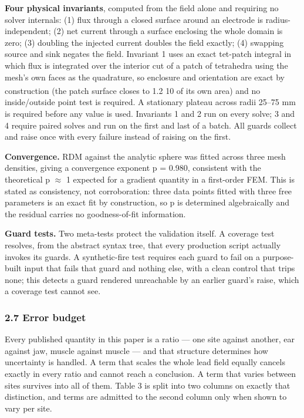 \documentclass[
  11pt,
  letterpaper,
]{article}
\newcounter{none} %
\begin{document}
\textbf{Four physical invariants}, computed from the field alone and requiring no
solver internals: (1) flux through a closed surface around an electrode is
radius-independent; (2) net current through a surface enclosing the whole domain
is zero; (3) doubling the injected current doubles the field exactly; (4)
swapping source and sink negates the field. Invariant 1 uses an exact tet-patch
integral in which flux is integrated over the interior cut of a patch of
tetrahedra using the mesh's own faces as the quadrature, so enclosure and
orientation are exact by construction (the patch surface closes to 1.2 \texttimes{} 10\textsuperscript{}
of its own area) and no inside/outside point test is required. A stationary
plateau across radii 25--75 mm is required before any value is used. Invariants 1
and 2 run on every solve; 3 and 4 require paired solves and run on the first and
last of a batch. All guards collect and raise once with every failure instead of
raising on the first.

\textbf{Convergence.} RDM against the analytic sphere was fitted across three mesh
densities, giving a convergence exponent p = 0.980, consistent with the
theoretical p $\approx$ 1 expected for a gradient quantity in a first-order FEM. This is
stated as consistency, not corroboration: three data points fitted with three
free parameters is an exact fit by construction, so p is determined
algebraically and the residual carries no goodness-of-fit information.

\textbf{Guard tests.} Two meta-tests protect the validation itself. A coverage test
resolves, from the abstract syntax tree, that every production script actually
invokes its guards. A synthetic-fire test requires each guard to fail on a
purpose-built input that fails that guard and nothing else, with a clean control
that trips none; this detects a guard rendered unreachable by an earlier guard's
raise, which a coverage test cannot see.

\subsubsection{2.7 Error budget}\label{error-budget}

Every published quantity in this paper is a ratio --- one site against another,
ear against jaw, muscle against muscle --- and that structure determines how
uncertainty is handled. A term that scales the whole lead field equally cancels
exactly in every ratio and cannot reach a conclusion. A term that varies between
sites survives into all of them. Table 3 is split into two columns on exactly
that distinction, and terms are admitted to the second column only when shown to
vary per site.
\end{document}
